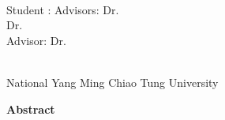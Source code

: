 \begin{center}
    \large
    
    \begin{singlespace}
        \textbf{\englishTitle{}} \\[0.5cm]
    \end{singlespace}
    
    \begin{singlespace}
        Student : \studentEnName{}  \hspace{1.0cm} 
        \ifdefined\advisorCnNameB
            Advisors: Dr.\, \advisorEnName \\
            \hspace{6.6cm} Dr.\, \advisorEnNameB  \\
        \else
            Advisor: Dr.\, \advisorEnName \\
        \fi
    \end{singlespace}
    
    \vspace{0.3cm}
    \begin{singlespace}
        \NameofDepartmentInstituteEN \\
        National Yang Ming Chiao Tung University \\[0.1cm]
    \end{singlespace}

    \textbf{Abstract} \\[0.3cm]

\end{center}

\normalsize

